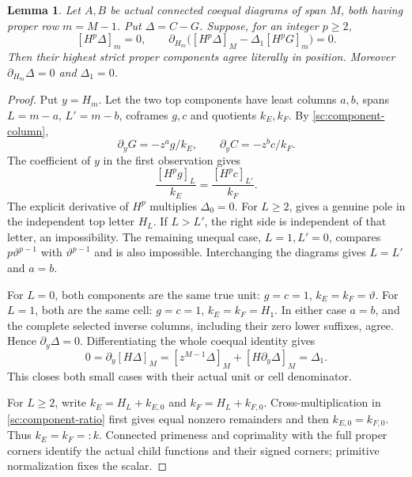 \documentclass[11pt,a4paper]{amsart}
\numberwithin{equation}{section}
\theoremstyle{plain}
\newtheorem{lemma}[theorem]{Lemma}
\theoremstyle{definition}
\begin{document}
\begin{lemma}
\label{sc:top-matching}
Let \(A,B\) be actual connected coequal diagrams of span \(M\), both
having proper row \(m=M-1\).  Put \(\Delta=C-G\).  Suppose, for an
integer \(p\ge2\),
\[
 [H^p\Delta]_m=0,
 \qquad
 \partial_{H_m}\bigl([H^p\Delta]_M
                      -\Delta_1[H^pG]_m\bigr)=0.
\]
Then their highest strict proper components agree literally in
position.  Moreover \(\partial_{H_m}\Delta=0\) and \(\Delta_1=0\).
\end{lemma}
\begin{proof}
Put \(y=H_m\).  Let the two top components have least columns \(a,b\),
spans \(L=m-a\), \(L'=m-b\), coframes \(g,c\) and quotients \(k_E,k_F\).
By \eqref{sc:component-column},
\[
 \partial_yG=-z^ag/k_E,\qquad
 \partial_yC=-z^bc/k_F.
\]
The coefficient of \(y\) in the first observation gives
\begin{equation}\label{sc:component-ratio}
 \frac{[H^pg]_L}{k_E}=\frac{[H^pc]_{L'}}{k_F}.
\end{equation}
The explicit derivative of \(H^p\) multiplies \(\Delta_0=0\).
For \(L\ge2\),  gives a genuine pole
in the independent top letter \(H_L\).  If \(L>L'\), the right side is
independent of that letter, an impossibility.  The remaining unequal
case, \(L=1,L'=0\), compares \(p\vartheta^{p-1}\) with \(\vartheta^{p-1}\) and is also
impossible.  Interchanging the diagrams gives \(L=L'\) and \(a=b\).

For \(L=0\), both components are the same true unit:
\(g=c=1\), \(k_E=k_F=\vartheta\).
For \(L=1\), both are the same cell:
\(g=c=1\), \(k_E=k_F=H_1\).
In either case \(a=b\), and the complete selected inverse columns,
including their zero lower suffixes, agree.  Hence
\(\partial_y\Delta=0\).  Differentiating the whole coequal identity
gives
\[
 0=\partial_y[H\Delta]_M
   =[z^{M-1}\Delta]_M+[H\partial_y\Delta]_M=\Delta_1.
\]
This closes both small cases with their actual unit or cell denominator.

For \(L\ge2\), write \(k_E=H_L+k_{E,0}\) and
\(k_F=H_L+k_{F,0}\).  Cross-multiplication in
\eqref{sc:component-ratio} first gives equal nonzero remainders
and then \(k_{E,0}=k_{F,0}\).  Thus \(k_E=k_F=:k\).
Connected primeness and coprimality with the full proper corners
identify the actual child functions and their signed corners; primitive
normalization fixes the scalar.


\end{proof}
\end{document}
